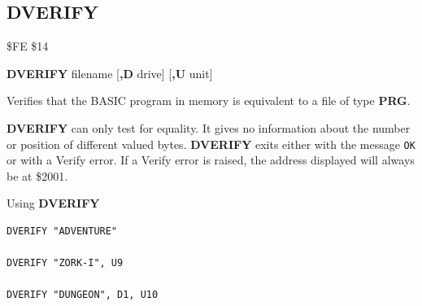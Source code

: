 \subsection{DVERIFY}
\begin{description}[leftmargin=2cm,style=nextline]
\item [Token:]    \$FE \$14

\item [Format:]   {\bf DVERIFY} filename [{\bf,D} drive] [{\bf,U} unit]

\item [Usage:]    Verifies that the BASIC program in memory is equivalent to a file of type {\bf PRG}.

                  \filenamedefinition

                  \drivedefinition

                  \unitdefinition

\item [Remarks:]  {\bf DVERIFY} can only test for equality. It gives no information about the number or position of different valued bytes. {\bf DVERIFY} exits either with the message \texttt{OK} or with a Verify error. If a Verify error is raised, the address displayed will always be at \$2001.

\item [Examples:] Using {\bf DVERIFY}

\begin{tcolorbox}[colback=black,coltext=white]
\verbatimfont{\codefont}
\begin{verbatim}
DVERIFY "ADVENTURE"

DVERIFY "ZORK-I", U9

DVERIFY "DUNGEON", D1, U10
\end{verbatim}
\end{tcolorbox}
\end{description}


\newpage
